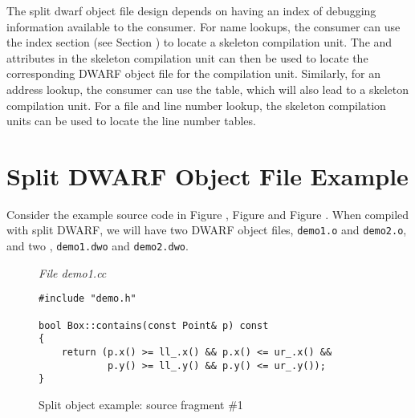 The split dwarf object file design depends on having an index of 
debugging information available to the consumer. For name lookups, 
the consumer can use the \dotdebugnames{} index section (see 
Section ) to 
locate a skeleton compilation unit. The
\DWATcompdir{} and \DWATdwoname{} attributes in the skeleton
compilation unit can then be used to locate the corresponding
DWARF object file for the compilation unit. Similarly, for an
address lookup, the consumer can use the \dotdebugaranges{} table,
which will also lead to a skeleton compilation unit. For a file
and line number lookup, the skeleton compilation units can be
used to locate the line number tables.

\clearpage

\section{Split DWARF Object File Example}
\label{app:splitdwarfobjectfileexample}
Consider the example source code in 
Figure , 
Figure  and
Figure .
When compiled with split DWARF, we will have two DWARF object files,
\texttt{demo1.o} and \texttt{demo2.o}, and two , 
\texttt{demo1.dwo} and \texttt{demo2.dwo}.

\begin{figure}[b]
\textit{File demo1.cc}
\begin{lstlisting}
#include "demo.h"

bool Box::contains(const Point& p) const
{
    return (p.x() >= ll_.x() && p.x() <= ur_.x() &&
            p.y() >= ll_.y() && p.y() <= ur_.y());
}
\end{lstlisting}
\caption{Split object example: source fragment \#1}
\label{fig:splitobjectexamplesourcefragment1}
\end{figure}

